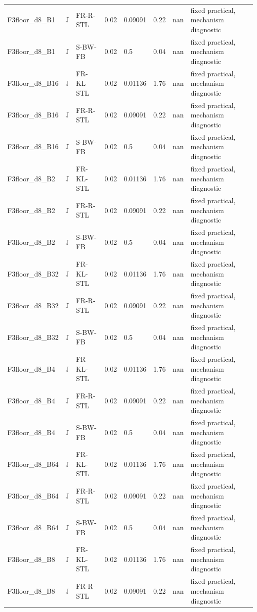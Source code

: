 \begin{tabular}{llllllll}
F3floor\_d8\_B1 & J & FR-R-STL & 0.02 & 0.09091 & 0.22 & nan & fixed practical, mechanism diagnostic \\
F3floor\_d8\_B1 & J & S-BW-FB & 0.02 & 0.5 & 0.04 & nan & fixed practical, mechanism diagnostic \\
F3floor\_d8\_B16 & J & FR-KL-STL & 0.02 & 0.01136 & 1.76 & nan & fixed practical, mechanism diagnostic \\
F3floor\_d8\_B16 & J & FR-R-STL & 0.02 & 0.09091 & 0.22 & nan & fixed practical, mechanism diagnostic \\
F3floor\_d8\_B16 & J & S-BW-FB & 0.02 & 0.5 & 0.04 & nan & fixed practical, mechanism diagnostic \\
F3floor\_d8\_B2 & J & FR-KL-STL & 0.02 & 0.01136 & 1.76 & nan & fixed practical, mechanism diagnostic \\
F3floor\_d8\_B2 & J & FR-R-STL & 0.02 & 0.09091 & 0.22 & nan & fixed practical, mechanism diagnostic \\
F3floor\_d8\_B2 & J & S-BW-FB & 0.02 & 0.5 & 0.04 & nan & fixed practical, mechanism diagnostic \\
F3floor\_d8\_B32 & J & FR-KL-STL & 0.02 & 0.01136 & 1.76 & nan & fixed practical, mechanism diagnostic \\
F3floor\_d8\_B32 & J & FR-R-STL & 0.02 & 0.09091 & 0.22 & nan & fixed practical, mechanism diagnostic \\
F3floor\_d8\_B32 & J & S-BW-FB & 0.02 & 0.5 & 0.04 & nan & fixed practical, mechanism diagnostic \\
F3floor\_d8\_B4 & J & FR-KL-STL & 0.02 & 0.01136 & 1.76 & nan & fixed practical, mechanism diagnostic \\
F3floor\_d8\_B4 & J & FR-R-STL & 0.02 & 0.09091 & 0.22 & nan & fixed practical, mechanism diagnostic \\
F3floor\_d8\_B4 & J & S-BW-FB & 0.02 & 0.5 & 0.04 & nan & fixed practical, mechanism diagnostic \\
F3floor\_d8\_B64 & J & FR-KL-STL & 0.02 & 0.01136 & 1.76 & nan & fixed practical, mechanism diagnostic \\
F3floor\_d8\_B64 & J & FR-R-STL & 0.02 & 0.09091 & 0.22 & nan & fixed practical, mechanism diagnostic \\
F3floor\_d8\_B64 & J & S-BW-FB & 0.02 & 0.5 & 0.04 & nan & fixed practical, mechanism diagnostic \\
F3floor\_d8\_B8 & J & FR-KL-STL & 0.02 & 0.01136 & 1.76 & nan & fixed practical, mechanism diagnostic \\
F3floor\_d8\_B8 & J & FR-R-STL & 0.02 & 0.09091 & 0.22 & nan & fixed practical, mechanism diagnostic \\

\end{tabular}
